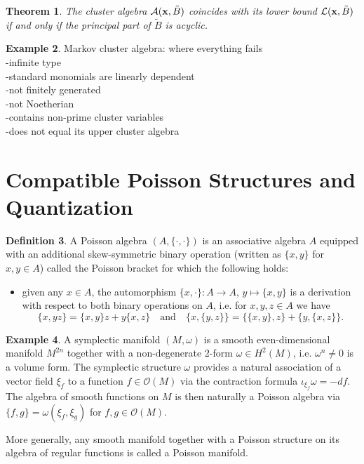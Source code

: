 \documentclass{amsart}
\newtheorem{theorem}{Theorem}[section]
\theoremstyle{definition}
\newtheorem{definition}[theorem]{Definition}
\newtheorem{example}[theorem]{Example}
\theoremstyle{remark}
\numberwithin{equation}{section}
\newcommand{\cA}{{\mathcal{A}}}
\newcommand{\cL}{{\mathcal{L}}}
\newcommand{\cO}{{\mathcal{O}}}
\newcommand{\x}{{\bf x}}
\begin{document}
  \begin{theorem}
    The cluster algebra $\cA(\x,\tilde B)$ coincides with its lower bound $\cL(\x,\tilde B)$ if and only if the principal part of $\tilde B$ is acyclic.
  \end{theorem}

  \begin{example}
    Markov cluster algebra: where everything fails\\
    -infinite type\\
    -standard monomials are linearly dependent\\
    -not finitely generated\\
    -not Noetherian\\
    -contains non-prime cluster variables\\
    -does not equal its upper cluster algebra
  \end{example}

\section{Compatible Poisson Structures and Quantization}\label{sec:poisson_and_quantum}

  \begin{definition}
    A Poisson algebra $(A,\{\cdot,\cdot\})$ is an associative algebra $A$ equipped with an additional skew-symmetric binary operation (written as $\{x,y\}$ for $x,y\in A$) called the Poisson bracket for which the following holds:
    \begin{itemize}
      \item given any $x\in A$, the automorphism $\{x,\cdot\}:A\to A$, $y\mapsto\{x,y\}$ is a derivation with respect to both binary operations on $A$, i.e. for $x,y,z\in A$ we have
      \begin{equation}
        \{x,yz\}=\{x,y\}z+y\{x,z\}\quad\text{and}\quad\{x,\{y,z\}\}=\{\{x,y\},z\}+\{y,\{x,z\}\}.
      \end{equation}
    \end{itemize}
  \end{definition}

  \begin{example}
    A symplectic manifold $(M,\omega)$ is a smooth even-dimensional manifold $M^{2n}$ together with a non-degenerate 2-form $\omega\in H^2(M)$, i.e. $\omega^n\ne0$ is a volume form.  The symplectic structure $\omega$ provides a natural association of a vector field $\xi_f$ to a function $f\in\cO(M)$ via the contraction formula $\iota_{\xi_f}\omega=-df$.  The algebra of smooth functions on $M$ is then naturally a Poisson algebra via $\{f,g\}=\omega(\xi_f,\xi_g)$ for $f,g\in\cO(M)$.
  \end{example}
  More generally, any smooth manifold together with a Poisson structure on its algebra of regular functions is called a Poisson manifold.
\end{document}
